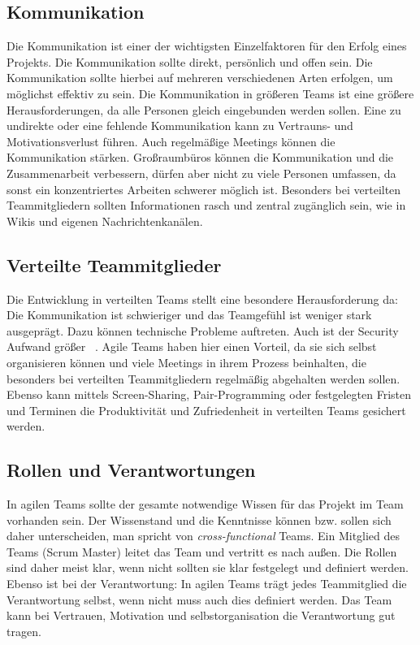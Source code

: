 \subsection{Kommunikation}
Die Kommunikation ist einer der wichtigsten Einzelfaktoren für den Erfolg eines Projekts. Die Kommunikation sollte direkt, persönlich und offen sein. Die Kommunikation sollte hierbei auf mehreren verschiedenen Arten erfolgen, um möglichst effektiv zu sein. Die Kommunikation in größeren Teams ist eine größere Herausforderungen, da alle Personen gleich eingebunden werden sollen. Eine zu undirekte oder eine fehlende Kommunikation kann zu Vertrauns- und Motivationsverlust führen. Auch regelmäßige Meetings können die Kommunikation stärken. Großraumbüros können die Kommunikation und die Zusammenarbeit verbessern, dürfen aber nicht zu viele Personen umfassen, da sonst ein konzentriertes Arbeiten schwerer möglich ist. Besonders bei verteilten Teammitgliedern sollten Informationen rasch und zentral zugänglich sein, wie in Wikis und eigenen Nachrichtenkanälen. 
\subsection{Verteilte Teammitglieder}
Die Entwicklung in verteilten Teams stellt eine besondere Herausforderung da: Die Kommunikation ist schwieriger und das Teamgefühl ist weniger stark ausgeprägt. Dazu können technische Probleme auftreten. Auch ist der Security Aufwand größer ~\parencite{sutherland2007distributed}. Agile Teams haben hier einen Vorteil, da sie sich selbst organisieren können und viele Meetings in ihrem Prozess beinhalten, die besonders bei verteilten Teammitgliedern regelmäßig abgehalten werden sollen. Ebenso kann mittels Screen-Sharing, Pair-Programming oder festgelegten Fristen und Terminen die Produktivität und Zufriedenheit in verteilten Teams gesichert werden. 
\subsection{Rollen und Verantwortungen}
In agilen Teams sollte der gesamte notwendige Wissen für das Projekt im Team vorhanden sein. Der Wissenstand und die Kenntnisse können bzw. sollen sich daher unterscheiden, man spricht von \textit{cross-functional} Teams.  Ein Mitglied des Teams (Scrum Master) leitet das Team und vertritt es nach außen. Die Rollen sind daher meist klar, wenn nicht sollten sie klar festgelegt und definiert werden. Ebenso ist bei der Verantwortung: In agilen Teams trägt jedes Teammitglied die Verantwortung selbst, wenn nicht muss auch dies definiert werden. Das Team kann bei Vertrauen, Motivation und selbstorganisation die Verantwortung gut tragen.
